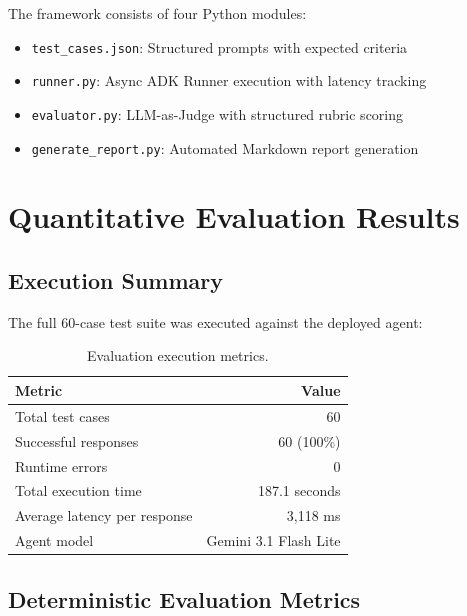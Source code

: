\documentclass[10pt,twocolumn,a4paper]{article}
\begin{document}
The framework consists of four Python modules:
\begin{itemize}[leftmargin=*,noitemsep,topsep=2pt]
    \item \texttt{test\_cases.json}: Structured prompts with expected criteria
    \item \texttt{runner.py}: Async ADK Runner execution with latency tracking
    \item \texttt{evaluator.py}: LLM-as-Judge with structured rubric scoring
    \item \texttt{generate\_report.py}: Automated Markdown report generation
\end{itemize}

\section{Quantitative Evaluation Results}
\label{sec:results}

\subsection{Execution Summary}

The full 60-case test suite was executed against the deployed agent:

\begin{table}[t]
\caption{Evaluation execution metrics.}
\label{tab:execution}
\setlength{\tabcolsep}{36pt}
\renewcommand{\arraystretch}{1.4}
\begin{tabular}{l r}
\toprule
\textbf{Metric} & \textbf{Value} \\
\midrule
Total test cases & 60 \\
Successful responses & 60 (100\%) \\
Runtime errors & 0 \\
Total execution time & 187.1 seconds \\
Average latency per response & 3{,}118 ms \\
Agent model & Gemini 3.1 Flash Lite \\
\bottomrule
\end{tabular}
\end{table}

\subsection{Deterministic Evaluation Metrics}
\end{document}
